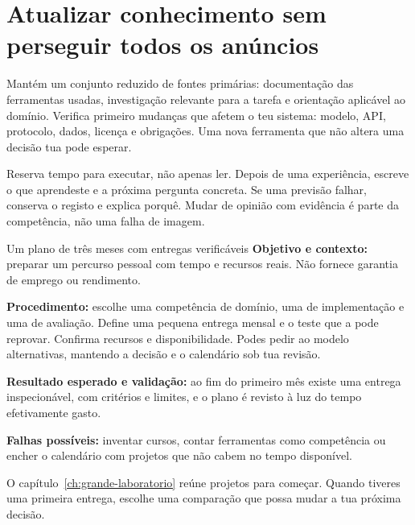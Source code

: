 \section{Atualizar conhecimento sem perseguir todos os anúncios}
Mantém um conjunto reduzido de fontes primárias: documentação das ferramentas usadas, investigação relevante para a tarefa e orientação aplicável ao domínio. Verifica primeiro mudanças que afetem o teu sistema: modelo, API, protocolo, dados, licença e obrigações. Uma nova ferramenta que não altera uma decisão tua pode esperar.

Reserva tempo para executar, não apenas ler. Depois de uma experiência, escreve o que aprendeste e a próxima pergunta concreta. Se uma previsão falhar, conserva o registo e explica porquê. Mudar de opinião com evidência é parte da competência, não uma falha de imagem.

\begin{promptlabbox}{Um plano de três meses com entregas verificáveis}
\textbf{Objetivo e contexto:} preparar um percurso pessoal com tempo e recursos reais. Não fornece garantia de emprego ou rendimento.

\textbf{Procedimento:} escolhe uma competência de domínio, uma de implementação e uma de avaliação. Define uma pequena entrega mensal e o teste que a pode reprovar. Confirma recursos e disponibilidade. Podes pedir ao modelo alternativas, mantendo a decisão e o calendário sob tua revisão.

\textbf{Resultado esperado e validação:} ao fim do primeiro mês existe uma entrega inspecionável, com critérios e limites, e o plano é revisto à luz do tempo efetivamente gasto.

\textbf{Falhas possíveis:} inventar cursos, contar ferramentas como competência ou encher o calendário com projetos que não cabem no tempo disponível.
\end{promptlabbox}

O capítulo~\ref{ch:grande-laboratorio} reúne projetos para começar. Quando tiveres uma primeira entrega, escolhe uma comparação que possa mudar a tua próxima decisão.
